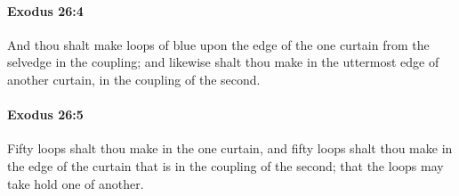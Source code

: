 		\paragraph{Exodus 26:4} %
			\label{EXODUS-26-4}

			And thou shalt make loops of blue upon the edge of the one curtain from the selvedge in the coupling; and likewise shalt thou make in the uttermost edge of another curtain, in the coupling of the second.


		\paragraph{Exodus 26:5} %
			\label{EXODUS-26-5}

			Fifty loops shalt thou make in the one curtain, and fifty loops shalt thou make in the edge of the curtain that is in the coupling of the second; that the loops may take hold one of another.

